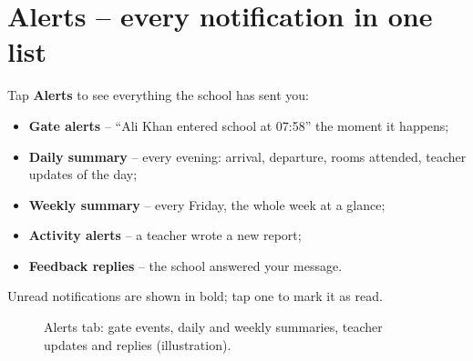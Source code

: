 \section{Alerts -- every notification in one list}

Tap \textbf{Alerts} to see everything the school has sent you:

\begin{itemize}[itemsep=2pt]
  \item \textbf{Gate alerts} -- ``Ali Khan entered school at 07:58''
        the moment it happens;
  \item \textbf{Daily summary} -- every evening: arrival, departure,
        rooms attended, teacher updates of the day;
  \item \textbf{Weekly summary} -- every Friday, the whole week at a
        glance;
  \item \textbf{Activity alerts} -- a teacher wrote a new report;
  \item \textbf{Feedback replies} -- the school answered your message.
\end{itemize}

Unread notifications are shown in bold; tap one to mark it as read.

\begin{figure}[H]
\centering
{}
\caption{Alerts tab: gate events, daily and weekly summaries, teacher
updates and replies (illustration).}
\end{figure}
